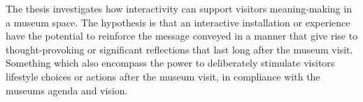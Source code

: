 \begin{comment}
\begin{itemize}
    \item \textbf{Main RQ:} How can one design meaningful interactive experiences in a museum space that addresses sustainability?
    \item answered by: \emph{(Sub-RQ):} synthesising (or objectifying?) meaningfulness as a quality that you can design for in a museum.
    \item through: \emph{(Sub-RQ):} finding/identifying dialogic relations between visitor and installation.
\end{itemize}
\end{comment}


The thesis investigates how interactivity can support visitors meaning-making in a museum space. The hypothesis is that an interactive installation or experience have the potential to reinforce the message conveyed in a manner that give rise to thought-provoking or significant reflections that last long after the museum visit. Something which also encompass the power to deliberately stimulate visitors lifestyle choices or actions after the museum visit, in compliance with the museums agenda and vision.